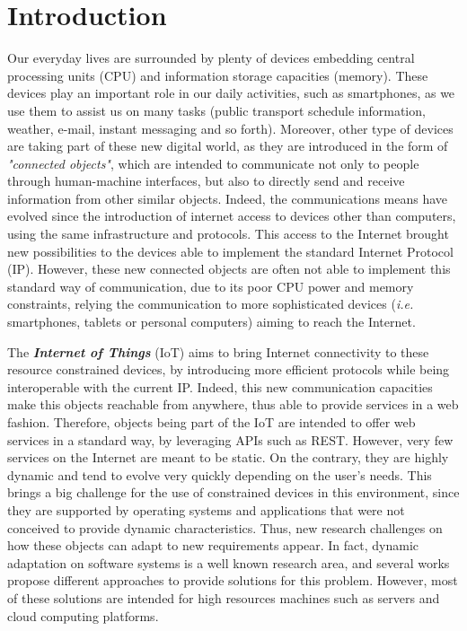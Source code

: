 \chapter{Introduction}
\label{ch:introduction}
Our everyday lives are surrounded by plenty of devices embedding central processing units (CPU) and information storage capacities (memory).
These devices play an important role in our daily activities, such as smartphones\cite{sarwar2013impact}, as we use them to assist us on many tasks (public transport schedule information, weather, e-mail, instant messaging and so forth).
Moreover, other type of devices are taking part of these new digital world, as they are introduced in the form of \textit{"connected objects"}, which are intended to communicate not only to people through human-machine interfaces, but also to directly send and receive information from other similar objects.
Indeed, the communications means have evolved since the introduction of internet access to devices other than computers, using the same infrastructure and protocols.
This access to the Internet brought new possibilities to the devices able to implement the standard Internet Protocol (IP).
However, these new connected objects are often not able to implement this standard way of communication, due to its poor CPU power and memory constraints, relying the communication to more sophisticated devices (\textit{i.e.} smartphones, tablets or personal computers) aiming to reach the Internet.

The \textbf{\textit{Internet of Things}} (IoT) aims to bring Internet connectivity to these resource constrained devices, by introducing more efficient protocols while being interoperable with the current IP.
Indeed, this new communication capacities make this objects reachable from anywhere, thus able to provide services in a web fashion.
Therefore, objects being part of the IoT are intended to offer web services in a standard way, by leveraging APIs such as REST\cite{Fielding02REST}.
However, very few services on the Internet are meant to be static.
On the contrary, they are highly dynamic and tend to evolve very quickly depending on the user's needs.
This brings a big challenge for the use of constrained devices in this environment, since they are supported by operating systems and applications that were not conceived to provide dynamic characteristics.
Thus, new research challenges on how these objects can adapt to new requirements appear.
In fact, dynamic adaptation on software systems is a well known research area, and several works propose different approaches to provide solutions for this problem.
However, most of these solutions are intended for high resources machines such as servers and cloud computing platforms.

